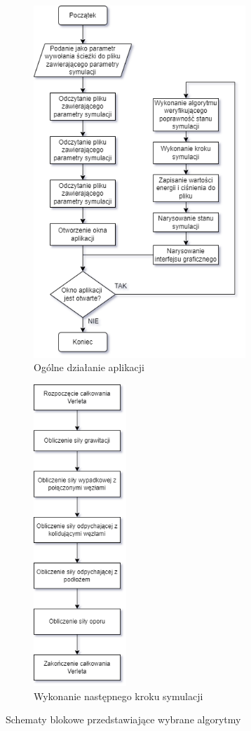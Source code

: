 \documentclass[12pt, letterpaper]{report}
\begin{document}
    \begin{figure}[h]

        \begin{subfigure}{0.5\textwidth}
            \centering
            \includegraphics[width=8cm]{main_flow.drawio.png}
            \caption{
                Ogólne działanie aplikacji
            }
        \end{subfigure}
        \begin{subfigure}{0.5\textwidth}
            \centering
            \includegraphics[width=3.5cm]{next_step.drawio.png}
            \caption{
                Wykonanie następnego kroku symulacji
            }
        \end{subfigure}
        
        \caption{Schematy blokowe przedstawiające wybrane algorytmy}
    \end{figure}
    
\end{document}
